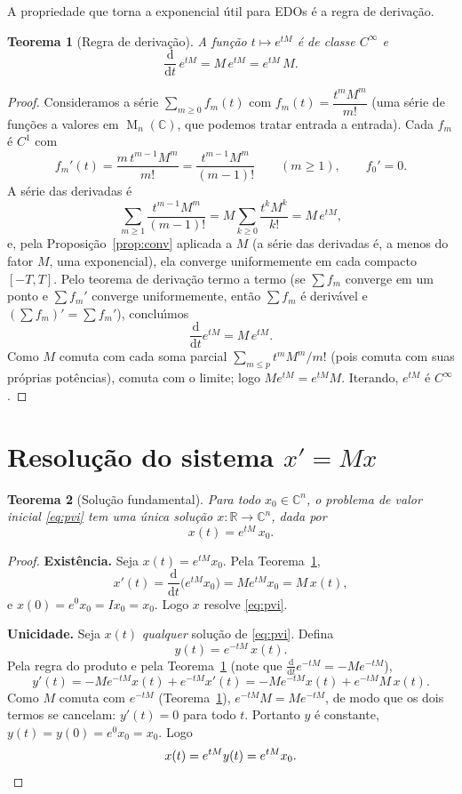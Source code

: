 \documentclass[11pt,a4paper]{amsart}
\newcommand{\R}{\mathbb{R}}
\newcommand{\C}{\mathbb{C}}
\renewcommand{\d}{\mathrm{d}}
\DeclareMathOperator{\Mat}{M}
\theoremstyle{plain}
\newtheorem{teorema}{Teorema}[section]
\theoremstyle{definition}
\theoremstyle{remark}
\begin{document}
A propriedade que torna a exponencial \'util para EDOs \'e a regra de
deriva\c{c}\~ao.

\begin{teorema}[Regra de deriva\c{c}\~ao]\label{thm:derivada}
A fun\c{c}\~ao $t\mapsto e^{tM}$ \'e de classe $C^{\infty}$ e
\[
  \frac{\d}{\d t}\,e^{tM} = M\,e^{tM} = e^{tM}\,M .
\]
\end{teorema}

\begin{proof}
Consideramos a s\'erie $\sum_{m\ge0} f_m(t)$ com $f_m(t)=\dfrac{t^m M^m}{m!}$
(uma s\'erie de fun\c{c}\~oes a valores em $\Mat_n(\C)$, que podemos tratar
entrada a entrada). Cada $f_m$ \'e $C^1$ com
\[
  f_m'(t) = \frac{m\,t^{m-1}M^m}{m!} = \frac{t^{m-1}M^m}{(m-1)!}
  \qquad (m\ge1),\qquad f_0'=0.
\]
A s\'erie das derivadas \'e
\[
  \sum_{m\ge1}\frac{t^{m-1}M^m}{(m-1)!}
  = M\sum_{k\ge0}\frac{t^k M^k}{k!} = M\,e^{tM},
\]
e, pela Proposi\c{c}\~ao~\ref{prop:conv} aplicada a $M$ (a s\'erie das
derivadas \'e, a menos do fator $M$, uma exponencial), ela converge
uniformemente em cada compacto $[-T,T]$. Pelo teorema de deriva\c{c}\~ao
termo a termo (se $\sum f_m$ converge em um ponto e $\sum f_m'$ converge
uniformemente, ent\~ao $\sum f_m$ \'e deriv\'avel e
$(\sum f_m)' = \sum f_m'$), conclu\'\i mos
\[
  \frac{\d}{\d t}e^{tM} = M\,e^{tM}.
\]
Como $M$ comuta com cada soma parcial $\sum_{m\le p} t^mM^m/m!$ (pois comuta com
suas pr\'oprias pot\^encias), comuta com o limite; logo $Me^{tM}=e^{tM}M$.
Iterando, $e^{tM}$ \'e $C^\infty$.
\end{proof}

\section{Resolu\c{c}\~ao do sistema $x'=Mx$}
\label{sec:solucao}

\begin{teorema}[Solu\c{c}\~ao fundamental]\label{thm:pvi}
Para todo $x_0\in\C^n$, o problema de valor inicial \eqref{eq:pvi} tem uma
\emph{\'unica} solu\c{c}\~ao $x\colon\R\to\C^n$, dada por
\[
  x(t) = e^{tM}\,x_0.
\]
\end{teorema}

\begin{proof}
\textbf{Exist\^encia.} Seja $x(t)=e^{tM}x_0$. Pela
Teorema~\ref{thm:derivada},
\[
  x'(t) = \frac{\d}{\d t}\big(e^{tM}x_0\big) = M e^{tM}x_0 = M\,x(t),
\]
e $x(0)=e^{0}x_0 = Ix_0 = x_0$. Logo $x$ resolve \eqref{eq:pvi}.

\medskip
\textbf{Unicidade.} Seja $x(t)$ \emph{qualquer} solu\c{c}\~ao de
\eqref{eq:pvi}. Defina
\[
  y(t) = e^{-tM}\,x(t).
\]
Pela regra do produto e pela Teorema~\ref{thm:derivada} (note que
$\frac{\d}{\d t}e^{-tM} = -M e^{-tM}$),
\[
  y'(t) = -M e^{-tM}x(t) + e^{-tM}x'(t)
        = -M e^{-tM}x(t) + e^{-tM}M\,x(t).
\]
Como $M$ comuta com $e^{-tM}$ (Teorema~\ref{thm:derivada}),
$e^{-tM}M = M e^{-tM}$, de modo que os dois termos se cancelam: $y'(t)=0$ para
todo $t$. Portanto $y$ \'e constante, $y(t)=y(0)=e^{0}x_0 = x_0$. Logo
\[
  x(t) = e^{tM}y(t) = e^{tM}x_0. \qedhere
\]
\end{proof}
\end{document}
